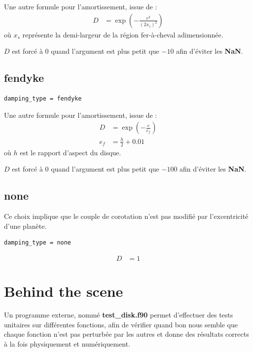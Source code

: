 Une autre formule pour l'amortissement, issue de \citep[eq. (16)]{pierens2013making} : 
\begin{align}
D &= \exp\left(-\frac{e^2}{(2x_s)^2}\right)
\end{align}
où $x_s$ représente la demi-largeur de la région fer-à-cheval adimensionnée.

$D$ est forcé à 0 quand l'argument est plus petit que $-10$ afin d'éviter les \textbf{NaN}.

\subsection{fendyke}
\begin{verbatim}
damping_type = fendyke
\end{verbatim}

Une autre formule pour l'amortissement, issue de \citep[eq. (8) et (10)]{fendyke2013corotation} : 
\begin{subequations}
\begin{align}
D &= \exp\left(-\frac{e}{e_f}\right)\\
e_f &= \frac{h}{2} + 0.01
\end{align}
\end{subequations}
où $h$ est le rapport d'aspect du disque. 

$D$ est forcé à 0 quand l'argument est plus petit que $-100$ afin d'éviter les \textbf{NaN}.

\subsection{none}
Ce choix implique que le couple de corotation n'est pas modifié par l'excentricité d'une planète.

\begin{verbatim}
damping_type = none
\end{verbatim}

\begin{align}
D &= 1
\end{align}


\section{Behind the scene}\label{sec:unitary_tests}
Un programme externe, nommé \textbf{test\_disk.f90} permet d'effectuer des tests unitaires sur différentes fonctions, afin de vérifier quand bon nous semble que chaque fonction n'est pas perturbée par les autres et donne des résultats corrects à la fois physiquement et numériquement.

